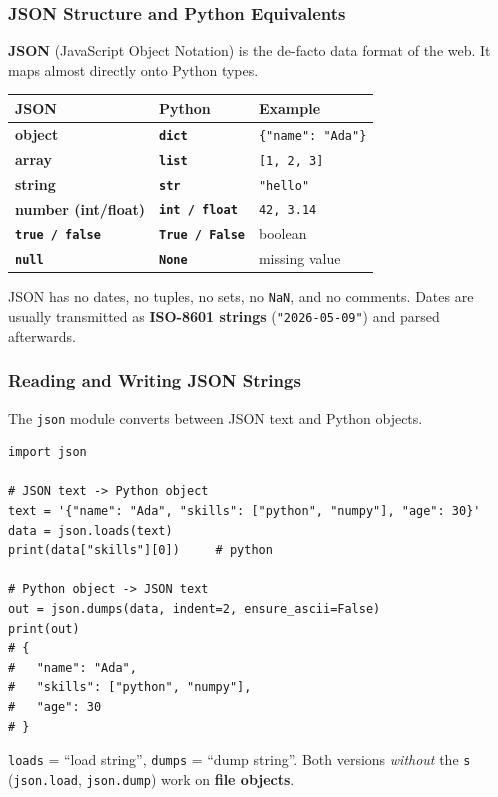\documentclass[aspectratio=169,10pt]{beamer}
\newcommand{\keyword}[1]{\textcolor{PrimaryBlue}{\textbf{#1}}}
\newcommand{\codeword}[1]{\texttt{#1}}
\newcommand{\code}[1]{\texttt{#1}}
\newenvironment{bluebox}[1]{%
  \vspace{0.08cm}\begin{tcolorbox}[lecturebox,title={#1},fontupper=\small]%
}{\end{tcolorbox}\vspace{0.05cm}}
\begin{document}
\begin{frame}[fragile]
\frametitle{JSON Structure and Python Equivalents}
\small
\keyword{JSON} (JavaScript Object Notation) is the de-facto data format of the web. It maps almost directly onto Python types.

\vspace{0.15cm}
\renewcommand{\arraystretch}{1.20}
\begin{tabularx}{\linewidth}{>{\bfseries}p{2.6cm}>{\bfseries}p{2.6cm}X}
\toprule
JSON & Python & Example \\
\midrule
object             & \code{dict}    & \code{\{"name": "Ada"\}} \\
array              & \code{list}    & \code{[1, 2, 3]} \\
string             & \code{str}     & \code{"hello"} \\
number (int/float) & \code{int / float} & \code{42, 3.14} \\
\code{true / false} & \code{True / False} & boolean \\
\code{null}        & \code{None}    & missing value \\
\bottomrule
\end{tabularx}

\vspace{0.15cm}
\begin{bluebox}{What JSON does \emph{not} have}
JSON has no dates, no tuples, no sets, no \codeword{NaN}, and no comments. Dates are usually transmitted as \keyword{ISO-8601 strings} (\codeword{"2026-05-09"}) and parsed afterwards.
\end{bluebox}
\end{frame}


\begin{frame}[fragile]
\frametitle{Reading and Writing JSON Strings}
\small
The \codeword{json} module converts between JSON text and Python objects.

\vspace{0.12cm}
\begin{lstlisting}[style=pycode]
import json

# JSON text -> Python object
text = '{"name": "Ada", "skills": ["python", "numpy"], "age": 30}'
data = json.loads(text)
print(data["skills"][0])     # python

# Python object -> JSON text
out = json.dumps(data, indent=2, ensure_ascii=False)
print(out)
# {
#   "name": "Ada",
#   "skills": ["python", "numpy"],
#   "age": 30
# }
\end{lstlisting}

\begin{tcolorbox}[lecturebox,title=The "s" in loads / dumps]
\codeword{loads} = ``load string'', \codeword{dumps} = ``dump string''. Both versions \emph{without} the \texttt{s} (\codeword{json.load}, \codeword{json.dump}) work on \keyword{file objects}.
\end{tcolorbox}
\end{frame}
\end{document}
